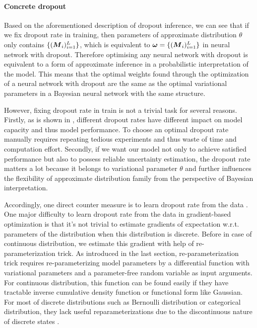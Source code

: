 \paragraph{Concrete dropout} 
Based on the aforementioned description of dropout inference, we can see that if we fix dropout rate in training, then parameters of approximate distribution $\theta$ only contains $\{(\boldsymbol M_{i})^L_{i=1}\}$, which is equivalent to $\boldsymbol \omega = \{(\boldsymbol M_{i})^L_{i=1}\}$ in neural network with dropout. Therefore optimising any neural network with dropout is equivalent to a form of approximate inference in a probabilistic interpretation of the model. This means that the optimal weights found through the optimization of a neural network with dropout are the same as the optimal variational parameters in a Bayesian neural network with the same structure. 

However, fixing dropout rate in train is not a trivial task for several reasons. Firstly, as is shown in \cite{srivastava2014dropout}, different dropout rates have different impact on model capacity and thus model performance. To choose an optimal dropout rate manually requires repeating tedious experiments and thus waste of time and computation effort. Secondly, if we want our model not only to achieve satisfied performance but also to possess reliable uncertainty estimation, the dropout rate matters a lot because it belongs to variational parameter $\theta$ and further influences the flexibility of approximate distribution family from the perspective of Bayesian interpretation.

Accordingly, one direct counter measure is to learn dropout rate from the data \cite{gal2017concrete}. One major difficulty to learn dropout rate from the data in gradient-based optimization is that it's not trivial to estimate gradients of expectation w.r.t. parameters of the distribution when this distribution is discrete. Before in case of continuous distribution, we estimate this gradient with help of re-parameterization trick. As introduced in the last section, re-parameterization trick requires re-parameterizing model parameters by a differential function with variational parameters and a parameter-free random variable as input arguments. For continuous distribution, this function can be found easily if they have tractable inverse cumulative density function or functional form like Gaussian\cite{kingma2013auto}. For most of discrete distributions such as Bernoulli distribution or categorical distribution, they lack useful reparameterizations
due to the discontinuous nature of discrete states \cite{maddison2016concrete}. 

